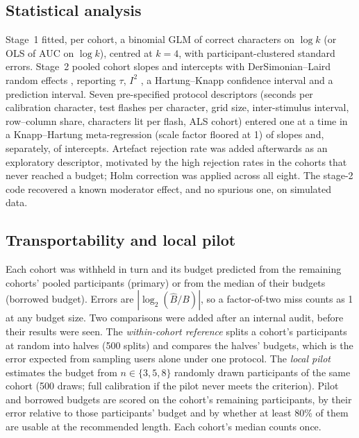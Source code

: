 \documentclass[conference]{IEEEtran}
\begin{document}
\subsection{Statistical analysis}
Stage~1 fitted, per cohort, a binomial GLM of correct characters on $\log k$ (or OLS of AUC on $\log k$), centred at $k=4$, with participant-clustered standard errors. Stage~2 pooled cohort slopes and intercepts with DerSimonian--Laird random effects \cite{dersimonian1986}, reporting $\tau$, $I^2$ \cite{higgins2002}, a Hartung--Knapp confidence interval \cite{knapp2003} and a prediction interval. Seven pre-specified protocol descriptors (seconds per calibration character, test flashes per character, grid size, inter-stimulus interval, row--column share, characters lit per flash, ALS cohort) entered one at a time in a Knapp--Hartung meta-regression (scale factor floored at 1) of slopes and, separately, of intercepts. Artefact rejection rate was added afterwards as an exploratory descriptor, motivated by the high rejection rates in the cohorts that never reached a budget; Holm correction \cite{holm1979} was applied across all eight. The stage-2 code recovered a known moderator effect, and no spurious one, on simulated data.

\subsection{Transportability and local pilot}
Each cohort was withheld in turn and its budget predicted from the remaining cohorts' pooled participants (primary) or from the median of their budgets (borrowed budget). Errors are $|\log_2(\hat{B}/B)|$, so a factor-of-two miss counts as 1 at any budget size. Two comparisons were added after an internal audit, before their results were seen. The \emph{within-cohort reference} splits a cohort's participants at random into halves (500 splits) and compares the halves' budgets, which is the error expected from sampling users alone under one protocol. The \emph{local pilot} estimates the budget from $n\in\{3,5,8\}$ randomly drawn participants of the same cohort (500 draws; full calibration if the pilot never meets the criterion). Pilot and borrowed budgets are scored on the cohort's remaining participants, by their error relative to those participants' budget and by whether at least 80\% of them are usable at the recommended length. Each cohort's median counts once.

\end{document}

